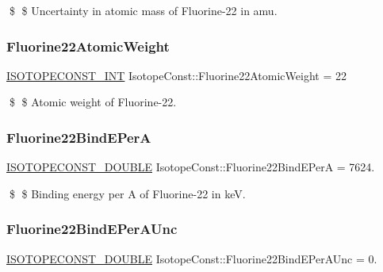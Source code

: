 \$ \$ Uncertainty in atomic mass of Fluorine-\/22 in amu. \mbox{\label{group___isotope_const-_fluorine-_f22_gaa260cbba53856e9680194eea66b7743d}} 
\subsubsection{\texorpdfstring{Fluorine22\+Atomic\+Weight}{Fluorine22AtomicWeight}}
{\footnotesize\ttfamily \mbox{\hyperlink{group___isotope_const-_macros_ga5f18360b3e99483a35c32d789e62621c}{I\+S\+O\+T\+O\+P\+E\+C\+O\+N\+S\+T\+\_\+\+I\+NT}} Isotope\+Const\+::\+Fluorine22\+Atomic\+Weight = 22}

\$ \$ Atomic weight of Fluorine-\/22. \mbox{\label{group___isotope_const-_fluorine-_f22_ga2c4e3cd675e20a1f9101d8905895dd00}} 
\subsubsection{\texorpdfstring{Fluorine22\+Bind\+E\+PerA}{Fluorine22BindEPerA}}
{\footnotesize\ttfamily \mbox{\hyperlink{group___isotope_const-_macros_ga8f45a7272ce02c0b4c65c44636ed719a}{I\+S\+O\+T\+O\+P\+E\+C\+O\+N\+S\+T\+\_\+\+D\+O\+U\+B\+LE}} Isotope\+Const\+::\+Fluorine22\+Bind\+E\+PerA = 7624.}

\$ \$ Binding energy per A of Fluorine-\/22 in keV. \mbox{\label{group___isotope_const-_fluorine-_f22_gad897a47cb830d0fff50fd2ccecb2fbdf}} 
\subsubsection{\texorpdfstring{Fluorine22\+Bind\+E\+Per\+A\+Unc}{Fluorine22BindEPerAUnc}}
{\footnotesize\ttfamily \mbox{\hyperlink{group___isotope_const-_macros_ga8f45a7272ce02c0b4c65c44636ed719a}{I\+S\+O\+T\+O\+P\+E\+C\+O\+N\+S\+T\+\_\+\+D\+O\+U\+B\+LE}} Isotope\+Const\+::\+Fluorine22\+Bind\+E\+Per\+A\+Unc = 0.}

